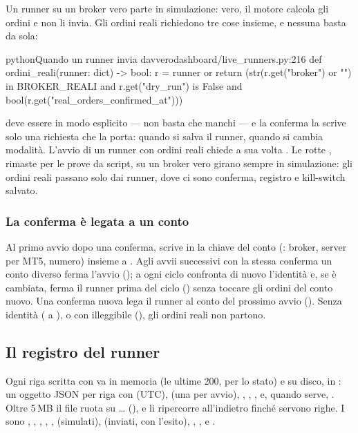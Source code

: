Un runner su un broker vero parte in simulazione:  vero, il
motore calcola gli ordini e non li invia. Gli ordini reali richiedono tre
cose insieme, e nessuna basta da sola:

\begin{codiceInterno}{python}{Quando un runner invia davvero}{dashboard/live\_runners.py:216}
def ordini_reali(runner: dict) -> bool:
    r = runner or {}
    return (str(r.get("broker") or "") in BROKER_REALI
            and r.get("dry_run") is False
            and bool(r.get("real_orders_confirmed_at")))
\end{codiceInterno}

\noindent
{} deve essere  in modo esplicito --- non basta che
manchi --- e la conferma la scrive solo una richiesta che la porta:
 quando si salva il runner,  quando
si cambia modalità. L'avvio di un runner con ordini reali chiede a sua volta
. Le rotte , rimaste per le
prove da script, su un broker vero girano sempre in simulazione: gli ordini
reali passano solo dai runner, dove ci sono conferma, registro e kill-switch
salvato.

\subsubsection{La conferma è legata a un conto}

Al primo avvio dopo una conferma,  scrive in
 la chiave del conto
(: broker, server per MT5, numero) insieme a
. Agli avvii successivi con la stessa
conferma un conto diverso ferma l'avvio (); a ogni ciclo
 confronta di nuovo l'identità e, se è cambiata,
ferma il runner prima del ciclo () senza toccare gli
ordini del conto nuovo. Una conferma nuova lega il runner al conto del
prossimo avvio (). Senza identità
( a ), o con 
illeggibile (), gli ordini reali non partono.

\subsection{Il registro del runner}\label{sez:live-registro}

Ogni riga scritta con  va in
memoria (le ultime \num{200}, per lo stato) e su disco, in
: un oggetto JSON per riga con
 (UTC),  (una per avvio), , ,
,  e, quando serve, . Oltre \num{5}\,MB il
file ruota su  \ldots{} 
(), e  li ripercorre
all'indietro finché servono righe. I  sono ,
, , , ,  (simulati),
 (inviati, con l'esito), , ,  e
.

